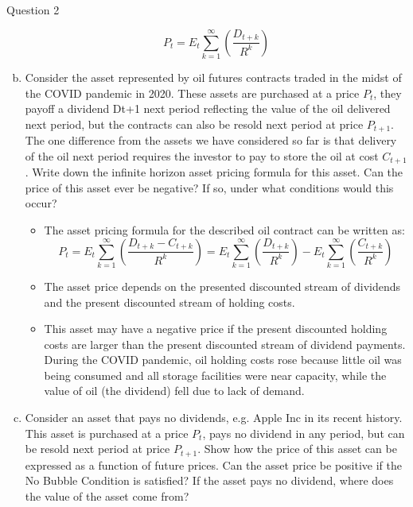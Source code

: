 \documentclass[a4paper]{article}
\begin{document}
\begin{questionbox}{Question 2}
\begin{enumerate}[(a)]
\begin{explanationbox}
\[					P_t = E_t \sum_{k=1}^\infty \left( \frac{D_{t+k}}{R^k} \right)
				\]
			\end{explanationbox}
			\item Consider the asset represented by oil futures contracts traded in the midst of the COVID pandemic in 2020. These assets are purchased at a price \( P_t \), they payoff a dividend Dt+1 next period reflecting the value of the oil delivered next period, but the contracts can also be resold next period at price \( P_{t+1} \). The one difference from the assets we have considered so far is that delivery of the oil next period requires the investor to pay to store the oil at cost \( C_{t+1} \). Write down the inﬁnite horizon asset pricing formula for this asset. Can the price of this asset ever be negative? If so, under what conditions would this occur?
			\begin{explanationbox}
				\begin{itemize}
					\item The asset pricing formula for the described oil contract can be written as:
					\[
						P_t = E_t \sum_{k=1}^\infty \left( \frac{D_{t+k} - C_{t+k}}{R^k} \right) = E_t \sum_{k=1}^\infty \left( \frac{D_{t+k}}{R^k} \right) - E_t \sum_{k=1}^\infty \left( \frac{C_{t+k}}{R^k} \right)
					\]
					\item The asset price depends on the presented discounted stream of dividends and the present discounted stream of holding costs.
					\item This asset may have a negative price if the present discounted holding costs are larger than the present discounted stream of dividend payments. During the COVID pandemic, oil holding costs rose because little oil was being consumed and all storage facilities were near capacity, while the value of oil (the dividend) fell due to lack of demand.
				\end{itemize}
			\end{explanationbox}
			\item Consider an asset that pays no dividends, e.g. Apple Inc in its recent history. This asset is purchased at a price \( P_t \), pays no dividend in any period, but can be resold next period at price \( P_{t+1} \). Show how the price of this asset can be expressed as a function of future prices. Can the asset price be positive if the No Bubble Condition is satisﬁed? If the asset pays no dividend, where does the value of the asset come from?
			\begin{explanationbox}
				\begin{itemize}

\end{itemize}
\end{explanationbox}
\end{enumerate}
\end{questionbox}
\end{document}
